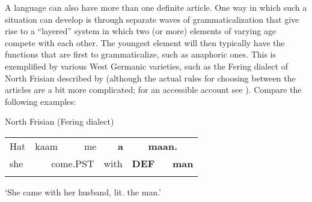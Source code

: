 \begin{styleBodytextC}
A language can also have more than one definite article. One way in which such a situation can develop is through separate waves of grammaticalization that give rise to a “layered” system in which two (or more) elements of varying age compete with each other. The youngest element will then typically have the functions that are first to grammaticalize, such as anaphoric ones. This is exemplified by various West Germanic varieties, such as the Fering dialect of North Frisian described by \citet{Ebert1971} (although the actual rules for choosing between the articles are a bit more complicated; for an accessible account see \citet[162]{Lyons1999}). Compare the following examples:

\end{styleBodytextC}

\begin{listWWNumileveli}
\item {}

\begin{styleExample}
North Frisian (Fering dialect)

\end{styleExample}

\end{listWWNumileveli}

\begin{listWWNumxvleveli}
  

\end{listWWNumxvleveli}

\begin{tabular}{llllllllll}
\lsptoprule
Hat & \multicolumn{2}{l}{kaam

} & \multicolumn{2}{l}{me

} & \multicolumn{2}{l}{{\bfseries a}

} & \multicolumn{2}{l}{{\bfseries maan.}

} & \\
\multicolumn{2}{l}{she

} & \multicolumn{2}{l}{come.PST

} & \multicolumn{2}{l}{with

} & \multicolumn{2}{l}{{\bfseries DEF}

} & \multicolumn{2}{l}{{\bfseries man}

}\\
\lspbottomrule
\end{tabular}

\begin{styleTranslation}
‘She came with her husband, lit. the man.’

\end{styleTranslation}

